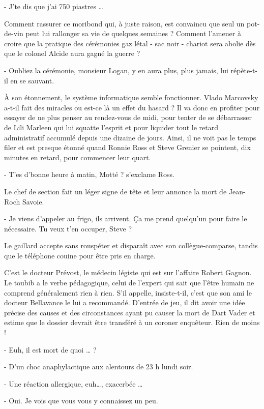 - J’te dis que j’ai 750 piastres …

Comment rassurer ce moribond qui, à juste raison, est convaincu que seul un pot-de-vin peut lui rallonger sa vie de quelques semaines ? Comment l’amener à croire que la pratique des cérémonies gaz létal - sac noir - chariot sera abolie dès que le colonel Alcide aura gagné la guerre ?

- Oubliez la cérémonie, monsieur Logan, y en aura plus, plus jamais, lui répète-t-il en se sauvant.

À son étonnement, le système informatique semble fonctionner. Vlado Marcovsky a-t-il fait des miracles ou est-ce là un effet du hasard ? Il va donc en profiter pour essayer de ne plus penser au rendez-vous de midi, pour tenter de se débarrasser de Lili Marleen qui lui squatte l’esprit et pour liquider tout le retard administratif accumulé depuis une dizaine de jours. Ainsi, il ne voit pas le temps filer et est presque étonné quand Ronnie Ross et Steve Grenier se pointent, dix minutes en retard, pour commencer leur quart.

- T’es d’bonne heure à matin, Motté ? s’exclame Ross.

Le chef de section fait un léger signe de tête et leur annonce la mort de Jean-Roch Savoie.

- Je viens d’appeler au frigo, ils arrivent. Ça me prend quelqu’un pour faire le nécessaire. Tu veux t’en occuper, Steve ?

Le gaillard accepte sans rouspéter et disparaît avec son collègue-comparse, tandis que le téléphone couine pour être pris en charge.

C’est le docteur Prévost, le médecin légiste qui est sur l’affaire Robert Gagnon. Le toubib a le verbe pédagogique, celui de l’expert qui sait que l’être humain ne comprend généralement rien à rien. S’il appelle, insiste-t-il, c’est que son ami le docteur Bellavance le lui a recommandé. D’entrée de jeu, il dit avoir une idée précise des causes et des circonstances ayant pu causer la mort de Dart Vader et estime que le dossier devrait être transféré à un coroner enquêteur. Rien de moins !

- Euh, il est mort de quoi … ?

- D’un choc anaphylactique aux alentours de 23 h lundi soir.

- Une réaction allergique, euh…, exacerbée …

- Oui. Je vois que vous vous y connaissez un peu.

